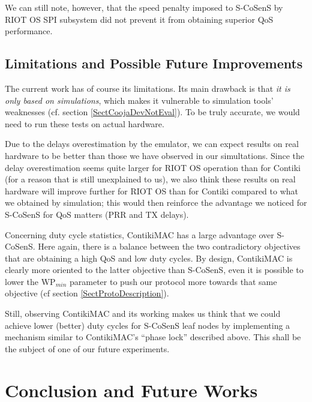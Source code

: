 \documentclass[conference]{IEEEtran}
\begin{document}
We can still note, however, that the speed penalty imposed to S-CoSenS by
RIOT OS SPI subsystem did not prevent it from obtaining superior QoS
performance.


\subsection{Limitations and Possible Future Improvements}
\label{SectLimits}

The current work has of course its limitations. Its main drawback is that
\emph{it is only based on simulations}, which makes it vulnerable to
simulation tools' weaknesses (cf. section \ref{SectCoojaDevNotEval}).
To be truly accurate, we would need to run these tests
on actual hardware.

Due to the delays overestimation by the emulator, we can expect results on
real hardware to be better than those we have observed in our simultations.
Since the delay overestimation seems quite larger for RIOT OS operation
than for Contiki (for a reason that is still unexplained to us),
we also think these results on real hardware will improve further
for RIOT OS than for Contiki compared to what we obtained by simulation;
this would then reinforce the advantage we noticed for S-CoSenS for
QoS matters (PRR and TX delays).

Concerning duty cycle statistics, ContikiMAC has a large advantage over
S-CoSenS. Here again, there is a balance between the two contradictory
objectives that are obtaining a high QoS and low duty cycles. By design,
ContikiMAC is clearly more oriented to the latter objective than S-CoSenS,
even it is possible to lower the $\mathrm{WP}_{min}$ parameter to push
our protocol more towards that same objective (cf section
\ref{SectProtoDescription}).

Still, observing ContikiMAC and its working makes us think that we could
achieve lower (better) duty cycles for S-CoSenS leaf nodes by implementing
a mechanism similar to ContikiMAC's ``phase lock'' described above. This
shall be the subject of one of our future experiments.



\section{Conclusion and Future Works}
\end{document}
